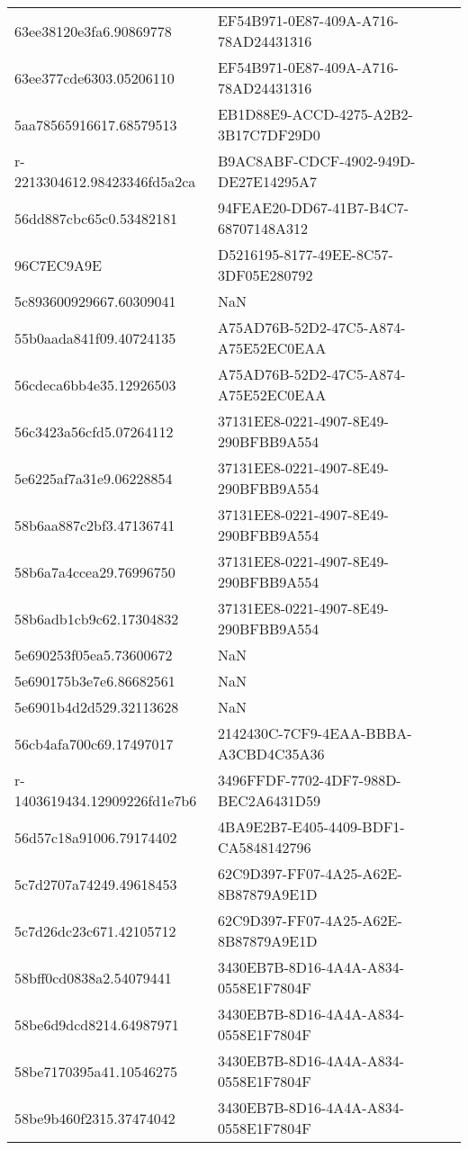 \begin{tabular}{ll}
63ee38120e3fa6.90869778 & EF54B971-0E87-409A-A716-78AD24431316 \\
63ee377cde6303.05206110 & EF54B971-0E87-409A-A716-78AD24431316 \\
5aa78565916617.68579513 & EB1D88E9-ACCD-4275-A2B2-3B17C7DF29D0 \\
r-2213304612.98423346fd5a2ca & B9AC8ABF-CDCF-4902-949D-DE27E14295A7 \\
56dd887cbc65c0.53482181 & 94FEAE20-DD67-41B7-B4C7-68707148A312 \\
96C7EC9A9E & D5216195-8177-49EE-8C57-3DF05E280792 \\
5c893600929667.60309041 & NaN \\
55b0aada841f09.40724135 & A75AD76B-52D2-47C5-A874-A75E52EC0EAA \\
56cdeca6bb4e35.12926503 & A75AD76B-52D2-47C5-A874-A75E52EC0EAA \\
56c3423a56cfd5.07264112 & 37131EE8-0221-4907-8E49-290BFBB9A554 \\
5e6225af7a31e9.06228854 & 37131EE8-0221-4907-8E49-290BFBB9A554 \\
58b6aa887c2bf3.47136741 & 37131EE8-0221-4907-8E49-290BFBB9A554 \\
58b6a7a4ccea29.76996750 & 37131EE8-0221-4907-8E49-290BFBB9A554 \\
58b6adb1cb9c62.17304832 & 37131EE8-0221-4907-8E49-290BFBB9A554 \\
5e690253f05ea5.73600672 & NaN \\
5e690175b3e7e6.86682561 & NaN \\
5e6901b4d2d529.32113628 & NaN \\
56cb4afa700c69.17497017 & 2142430C-7CF9-4EAA-BBBA-A3CBD4C35A36 \\
r-1403619434.12909226fd1e7b6 & 3496FFDF-7702-4DF7-988D-BEC2A6431D59 \\
56d57c18a91006.79174402 & 4BA9E2B7-E405-4409-BDF1-CA5848142796 \\
5c7d2707a74249.49618453 & 62C9D397-FF07-4A25-A62E-8B87879A9E1D \\
5c7d26dc23c671.42105712 & 62C9D397-FF07-4A25-A62E-8B87879A9E1D \\
58bff0cd0838a2.54079441 & 3430EB7B-8D16-4A4A-A834-0558E1F7804F \\
58be6d9dcd8214.64987971 & 3430EB7B-8D16-4A4A-A834-0558E1F7804F \\
58be7170395a41.10546275 & 3430EB7B-8D16-4A4A-A834-0558E1F7804F \\
58be9b460f2315.37474042 & 3430EB7B-8D16-4A4A-A834-0558E1F7804F \\

\end{tabular}
